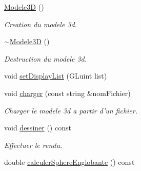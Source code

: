 \begin{DoxyCompactItemize}
\item 
\hyperlink{group__inf2990_ga61424b36eaf9f88c825890aa57192bfd}{Modele3\-D} ()
\begin{DoxyCompactList}\small\item\em Creation du modele 3d. \end{DoxyCompactList}\item 
\hyperlink{group__inf2990_ga28d3f261304927aa825e902c61555307}{$\sim$\-Modele3\-D} ()
\begin{DoxyCompactList}\small\item\em Destruction du modele 3d. \end{DoxyCompactList}\item 
void \hyperlink{group__inf2990_ga2d4fe693acad70384447b9db282e3912}{set\-Display\-List} (G\-Luint list)
\item 
void \hyperlink{group__inf2990_gae9a28411f50e679373dd41c62ffc9698}{charger} (const string \&nom\-Fichier)
\begin{DoxyCompactList}\small\item\em Charger le modele 3d a partir d'un fichier. \end{DoxyCompactList}\item 
void \hyperlink{group__inf2990_ga024588f2e5354c3753dd73278e7755e4}{dessiner} () const 
\begin{DoxyCompactList}\small\item\em Effectuer le rendu. \end{DoxyCompactList}\item 
\hypertarget{group__inf2990_ga2f6cf63dd757e87478e5bf109431a1f5}{double \hyperlink{group__inf2990_ga2f6cf63dd757e87478e5bf109431a1f5}{calculer\-Sphere\-Englobante} () const }\label{group__inf2990_ga2f6cf63dd757e87478e5bf109431a1f5}


\end{DoxyCompactItemize}
